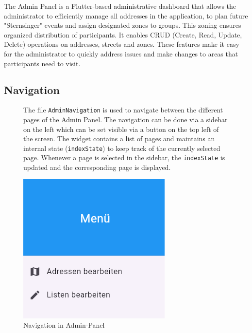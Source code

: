 \Author{\daAuthorOne}


The Admin Panel is a Flutter-based administrative dashboard that allows the administrator to efficiently manage all addresses in the application, to plan  future "Sternsinger" events and assign designated zones to groups. This zoning ensures organized distribution of participants. It enables CRUD (Create, Read, Update, Delete) operations on addresses, streets and zones. These features make it easy for the administrator to quickly address issues and make changes to areas that participants need to visit.

\subsection{Navigation}

\noindent

\begin{figure}[H]

\begin{minipage}{0.58\textwidth}
    The file \texttt{AdminNavigation} is used to navigate between the different pages of the Admin Panel. The navigation can be done via a sidebar on the left which can be set visible via a button on the top left of the screen. The widget contains a list of pages and maintains an internal state (\texttt{indexState}) to keep track of the currently selected page. Whenever a page is selected in the sidebar, the \texttt{indexState} is updated and the corresponding page is displayed.
    \end{minipage}
    \hfill
    \begin{minipage}{0.38\textwidth}
    \centering
    \includegraphics[width=0.7\linewidth]{images/AdminPanel/Menu.png}
    \caption{Navigation in Admin-Panel}
    \label{fig:adminpanel_navigation}
\end{minipage}

\end{figure}




